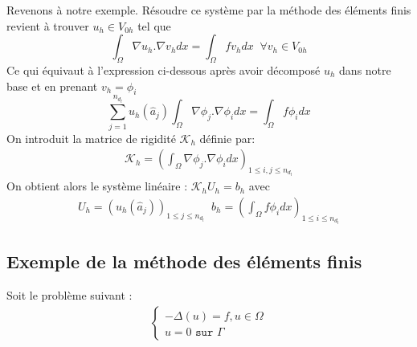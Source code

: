 Revenons à notre exemple. Résoudre ce système par la méthode des éléments finis revient à trouver $u_{h}\in V_{0h}$ tel que
\begin{equation*}
\int_{\Omega}\nabla u_{h}.\nabla v_{h}dx=\int_{\Omega}fv_{h}dx \;\; \forall v_{h}\in V_{0h}
\end{equation*}
Ce qui équivaut à l'expression ci-dessous après avoir décomposé $u_h$ dans notre base et en prenant $v_{h}=\phi_{i}$
\begin{equation*}
\sum_{j=1}^{n_{d_{l}}}u_h\left(\hat{a}_{j}\right)\int_{\Omega}\nabla\phi_{j}.\nabla\phi_{i}dx=\int_{\Omega}f\phi_{i}dx
\end{equation*}
On introduit la matrice de rigidité $\mathcal{K}_{h}$ définie par:
\begin{align*}
\mathcal{K}_{h}=\left(\int_{\Omega}\nabla\phi_{j}.\nabla\phi_{i} dx\right)_{1\leq i, j\leq n_{d_{l}}}
\end{align*}
On obtient alors le système linéaire : $\mathcal{K}_{h}U_{h}=b_{h}$ avec
\begin{align*}
U_{h}=\left(u_{h}\left(\hat{a}_{j}\right)\right)_{1\leq j \leq n_{d_{l}}} \;\; b_{h}=\left(\int_{\Omega}f\phi_{i}dx\right)_{1\leq i\leq n_{d_{l}}}
\end{align*}
\subsection{Exemple de la méthode des éléments finis}
Soit le problème suivant :
\begin{align*}
\left\{\begin{matrix}
-\Delta\left(u\right)=f,  u\in\Omega\\
u=0 \texttt{ sur }\Gamma
\end{matrix}
 \right.
\end{align*}
